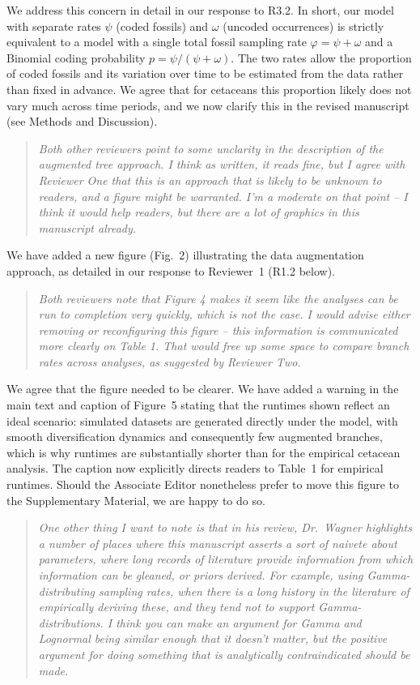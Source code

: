 \documentclass[11pt]{article}
\newenvironment{RC}{\begin{quote}\itshape}{\end{quote}}
\newcommand{\response}[1]{\noindent\textcolor{resp}{#1}\medskip}
\begin{document}
\response{We address this concern in detail in our response to R3.2. In short, our model with separate rates $\psi$ (coded fossils) and $\omega$ (uncoded occurrences) is strictly equivalent to a model with a single total fossil sampling rate $\varphi = \psi + \omega$ and a Binomial coding probability $p = \psi/(\psi+\omega)$. The two rates allow the proportion of coded fossils and its variation over time to be estimated from the data rather than fixed in advance. We agree that for cetaceans this proportion likely does not vary much across time periods, and we now clarify this in the revised manuscript (see Methods and Discussion).}

\begin{RC}
Both other reviewers point to some unclarity in the description of the augmented tree approach. I think as written, it reads fine, but I agree with Reviewer One that this is an approach that is likely to be unknown to readers, and a figure might be warranted. I'm a moderate on that point -- I think it would help readers, but there are a lot of graphics in this manuscript already.
\end{RC}

\response{We have added a new figure (Fig.~2) illustrating the data augmentation approach, as detailed in our response to Reviewer~1 (R1.2 below).}

\begin{RC}
Both reviewers note that Figure 4 makes it seem like the analyses can be run to completion very quickly, which is not the case. I would advise either removing or reconfiguring this figure -- this information is communicated more clearly on Table 1. That would free up some space to compare branch rates across analyses, as suggested by Reviewer Two.
\end{RC}

\response{We agree that the figure needed to be clearer. We have added a warning in the main text and caption of Figure~5 stating that the runtimes shown reflect an ideal scenario: simulated datasets are generated directly under the model, with smooth diversification dynamics and consequently few augmented branches, which is why runtimes are substantially shorter than for the empirical cetacean analysis. The caption now explicitly directs readers to Table~1 for empirical runtimes. Should the Associate Editor nonetheless prefer to move this figure to the Supplementary Material, we are happy to do so.}

\begin{RC}
One other thing I want to note is that in his review, Dr.\ Wagner highlights a number of places where this manuscript asserts a sort of naivete about parameters, where long records of literature provide information from which information can be gleaned, or priors derived. For example, using Gamma-distributing sampling rates, when there is a long history in the literature of empirically deriving these, and they tend not to support Gamma-distributions. I think you can make an argument for Gamma and Lognormal being similar enough that it doesn't matter, but the positive argument for doing something that is analytically contraindicated should be made.
\end{RC}
\end{document}
